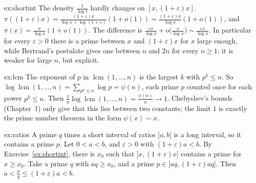 \begin{solution}{ex:shortint}
\idea The density $\frac1{\log t}$ hardly changes on $[x,(1+\varepsilon)x]$.
\writeup $\pi((1+\varepsilon)x)=\frac{(1+\varepsilon)x}{\log x+\log(1+\varepsilon)}(1+o(1))=\frac{(1+\varepsilon)x}{\log x}(1+o(1))$, and $\pi(x)=\frac x{\log x}(1+o(1))$. The difference is
$\frac{\varepsilon x}{\log x}+o\bigl(\frac x{\log x}\bigr)\sim\frac{\varepsilon x}{\log x}$. In particular for every $\varepsilon>0$ there is a prime between $x$ and $(1+\varepsilon)x$ for $x$ large enough, while Bertrand's postulate
gives one between $n$ and $2n$ for every $n\ge1$: it is weaker for large $n$, but explicit.
\end{solution}

\begin{solution}{ex:lcm}
\idea The exponent of $p$ in $\operatorname{lcm}(1,\dots,n)$ is the largest $k$ with $p^k\le n$.
\writeup So $\log\operatorname{lcm}(1,\dots,n)=\sum_{p^k\le n}\log p=\psi(n)$, each prime $p$ counted once for each power $p^k\le n$. Then $\frac1n\log\operatorname{lcm}(1,\dots,n)=\frac{\psi(n)}n\to1$. Chebyshev's
bounds (Chapter~1) only give that this lies between two constants; the limit $1$ is exactly the prime number theorem in the form $\psi(x)\sim x$.
\end{solution}

\begin{solution}{ex:ratios}
\idea A prime $q$ times a short interval of ratios $]a,b[$ is a long interval, so it contains a prime $p$.
\writeup Let $0<a<b$, and $\varepsilon>0$ with $(1+\varepsilon)a<b$. By Exercise~\ref{ex:shortint}, there is $x_0$ such that $]x,(1+\varepsilon)x]$ contains a prime for $x\ge x_0$. Take a prime $q$ with
$aq\ge x_0$, and a prime $p\in]aq,(1+\varepsilon)aq]$. Then $a<\frac pq\le(1+\varepsilon)a<b$.
\end{solution}


